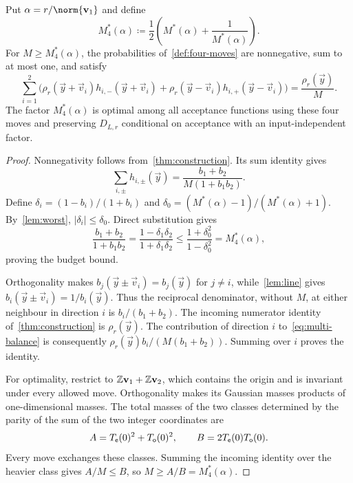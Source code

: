 \begin{theorem}
\label{thm:four-optimal}
Put $\alpha=r/\norm{\vec v_1}$ and define
\begin{equation}
\label{eq:four-rate}
 M_4^*(\alpha)\coloneqq\frac12\left(M^*(\alpha)+\frac1{M^*(\alpha)}\right).
\end{equation}
For $M\ge M_4^*(\alpha)$, the probabilities of~\cref{def:four-moves} are nonnegative, sum to at most one, and satisfy
\begin{equation}
\label{eq:multi-balance}
 \sum_{i=1}^2\bigl(\rho_r(\vec y+\vec v_i)h_{i,-}(\vec y+\vec v_i)
 +\rho_r(\vec y-\vec v_i)h_{i,+}(\vec y-\vec v_i)\bigr)=\frac{\rho_r(\vec y)}M.
\end{equation}
The factor $M_4^*(\alpha)$ is optimal among all acceptance functions using these four moves and preserving $D_{L,r}$ conditional on acceptance with an input-independent factor.
\end{theorem}
\begin{proof}
Nonnegativity follows from~\cref{thm:construction}. Its sum identity gives
\[
 \sum_{i,\pm}h_{i,\pm}(\vec y)=\frac{b_1+b_2}{M(1+b_1b_2)}.
\]
Define $\delta_i=(1-b_i)/(1+b_i)$ and $\delta_0=(M^*(\alpha)-1)/(M^*(\alpha)+1)$. By~\cref{lem:worst}, $|\delta_i|\le\delta_0$. Direct substitution gives
\[
 \frac{b_1+b_2}{1+b_1b_2}=\frac{1-\delta_1\delta_2}{1+\delta_1\delta_2}
 \le\frac{1+\delta_0^2}{1-\delta_0^2}=M_4^*(\alpha),
\]
proving the budget bound.

Orthogonality makes $b_j(\vec y\pm\vec v_i)=b_j(\vec y)$ for $j\ne i$, while~\cref{lem:line} gives $b_i(\vec y\pm\vec v_i)=1/b_i(\vec y)$. Thus the reciprocal denominator, without $M$, at either neighbour in direction $i$ is $b_i/(b_1+b_2)$. The incoming numerator identity of~\cref{thm:construction} is $\rho_r(\vec y)$. The contribution of direction $i$ to~\cref{eq:multi-balance} is consequently $\rho_r(\vec y)b_i/(M(b_1+b_2))$. Summing over $i$ proves the identity.

For optimality, restrict to $\mathbb{Z}\mathbf{v}_1+\mathbb{Z}\mathbf{v}_2$, which contains the origin and is invariant under every allowed move. Orthogonality makes its Gaussian masses products of one-dimensional masses. The total masses of the two classes determined by the parity of the sum of the two integer coordinates are
\[
 A=T_{\mathsf e}(0)^2+T_{\mathsf o}(0)^2,\qquad B=2T_{\mathsf e}(0)T_{\mathsf o}(0).
\]
Every move exchanges these classes. Summing the incoming identity over the heavier class gives $A/M\le B$, so $M\ge A/B=M_4^*(\alpha)$.
\end{proof}

